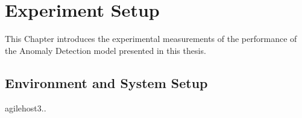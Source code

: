 

\section{Experiment Setup}
\label{s:Experiment-Setup}

This Chapter introduces the experimental measurements of the performance of the Anomaly Detection model presented in this thesis. 

\subsection{Environment and System Setup}
\label{s:Experiment-Env}
agilehost3.. 


